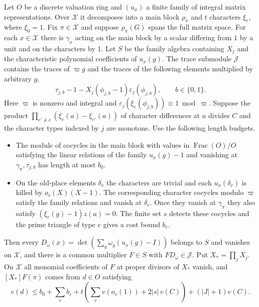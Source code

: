 \begin{lemma}
\label{lem:c-abstract-ribet-element}
\emitthmsource
Let $O$ be a discrete valuation ring and $(u_x)$ a finite family of integral matrix representations. Over $\mathcal X$ it decomposes into a main block $\rho_x$ and $t$ characters $\xi_e$, where $\xi_0=1$. Fix $\pi\in\mathcal X$ and suppose $\rho_\pi(G)$ spans the full matrix space. For each $x\in\mathcal X$ there is $\gamma_x$ acting on the main block by a scalar differing from $1$ by a unit and on the characters by $1$. Let $S$ be the family algebra containing $X_j$ and the characteristic polynomial coefficients of $u_x(g)$. The trace submodule $\mathcal J$ contains the traces of $\varpi g$ and the traces of the following elements multiplied by arbitrary $g$.
\[
  \tau_{j,b}-1-X_j(\phi_{j,b}-1)\varepsilon_j(\phi_{j,b}),
  \qquad b\in\{0,1\}.
\]
Here $\varpi$ is nonzero and integral and $\varepsilon_j(\xi_e(\phi_{j,b}))\equiv1\bmod\varpi$. Suppose the product $\prod_{e'\ne e}(\xi_e(a)-\xi_{e'}(a))$ of character differences at $a$ divides $C$ and the character types indexed by $j$ are monotone. Use the following length budgets.
\begin{itemize}
\item The module of cocycles in the main block with values in $\operatorname{Frac}(O)/O$ satisfying the linear relations of the family $u_x(g)-1$ and vanishing at $\gamma_\pi,\tau_{j,b}$ has length at most $b_0$.
\item On the old-place elements $\delta_v$ the characters are trivial and each $u_x(\delta_v)$ is killed by $o_v(X)(X-1)$. The corresponding character cocycles modulo $\varpi$ satisfy the family relations and vanish at $\delta_v$. Once they vanish at $\gamma_\pi$ they also satisfy $(\xi_e(g)-1)z(a)=0$. The finite set $s$ detects these cocycles and the prime triangle of type $e$ gives a cost bound $b_e$.
\end{itemize}
Then every $D_\omega(x)=\det(\sum_g\omega_g(u_x(g)-I))$ belongs to $S$ and vanishes on $\mathcal X$, and there is a common multiplier $F\in S$ with $F D_\omega\in\mathcal J$. Put $X_\ast=\prod_j X_j$. On $\mathcal X$ all monomial coefficients of $F$ at proper divisors of $X_\ast$ vanish, and $[X_\ast]F(\pi)$ comes from $d\in O$ satisfying
\[
 v(d)\le b_0+\sum_e b_e+
 t\left(\sum_v v(o_v(1))+2|s|\,v(C)\right)+(|J|+1)v(C).
\]
\end{lemma}

